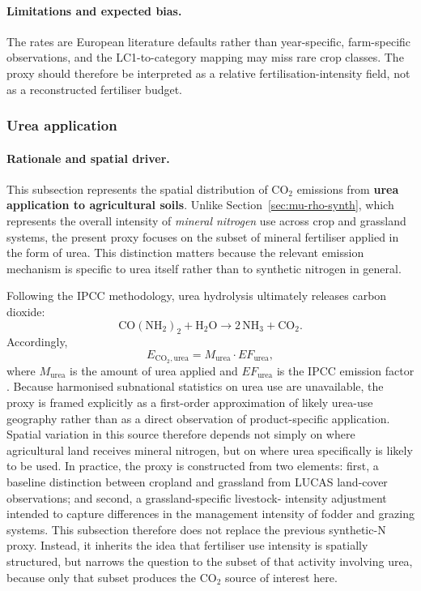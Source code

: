 \paragraph{Limitations and expected bias.}
The rates are European literature defaults rather than year-specific,
farm-specific observations, and the LC1-to-category mapping may miss
rare crop classes. The proxy should therefore be interpreted as a
relative fertilisation-intensity field, not as a reconstructed
fertiliser budget.

\subsubsection{Urea application}
\label{sec:mu-rho-urea}

\paragraph{Rationale and spatial driver.}
This subsection represents the spatial distribution of CO$_2$ emissions
from \textbf{urea application to agricultural soils}. Unlike
Section~\ref{sec:mu-rho-synth}, which represents the overall intensity
of \emph{mineral nitrogen} use across crop and grassland systems, the
present proxy focuses on the subset of mineral fertiliser applied in
the form of urea. This distinction matters because the relevant
emission mechanism is specific to urea itself rather than to synthetic
nitrogen in general.

Following the IPCC methodology, urea hydrolysis ultimately releases
carbon dioxide:
\begin{equation}
  \mathrm{CO(NH_2)_2 + H_2O \rightarrow 2\,NH_3 + CO_2}.
\end{equation}
Accordingly,
\begin{equation}
  E_{\mathrm{CO_2},\mathrm{urea}} =
  M_{\mathrm{urea}} \cdot EF_{\mathrm{urea}},
\end{equation}
where $M_{\mathrm{urea}}$ is the amount of urea applied and
$EF_{\mathrm{urea}}$ is the IPCC emission factor
\citep{IPPC_2006_V10}. Because harmonised subnational statistics on
urea use are unavailable, the proxy is framed explicitly as a
first-order approximation of likely urea-use geography rather than as a
direct observation of product-specific application. Spatial variation in
this source therefore depends not simply on where agricultural land
receives mineral nitrogen, but on where urea specifically is likely to
be used. In practice, the proxy is constructed from two elements:
first, a baseline distinction between cropland and grassland from LUCAS
land-cover observations; and second, a grassland-specific livestock-
intensity adjustment intended to capture differences in the management
intensity of fodder and grazing systems. This subsection therefore does
not replace the previous synthetic-N proxy. Instead, it inherits the
idea that fertiliser use intensity is spatially structured, but narrows
the question to the subset of that activity involving urea, because
only that subset produces the CO$_2$ source of interest here.

